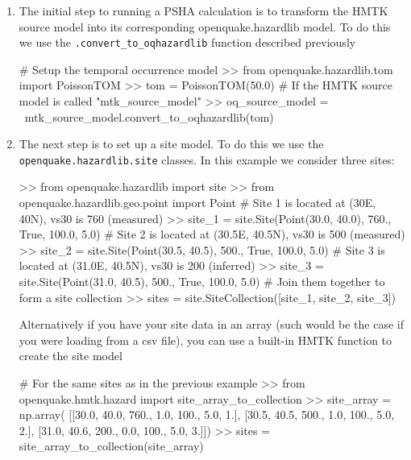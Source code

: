 \begin{enumerate}

\item The initial step to running a PSHA calculation is to transform the HMTK source model into its corresponding openquake.hazardlib model. To do this we use the \verb=.convert_to_oqhazardlib= function described previously

\begin{python}[frame=single]
# Setup the temporal occurrence model
>> from openquake.hazardlib.tom import PoissonTOM
>> tom = PoissonTOM(50.0)
# If the HMTK source model is called "mtk_source_model"
>> oq_source_model = \
    mtk_source_model.convert_to_oqhazardlib(tom)
\end{python}

\item The next step is to set up a site model. To do this we use the \\ \verb=openquake.hazardlib.site= classes. In this example we consider three sites:

\begin{python}[frame=single]
>> from openquake.hazardlib import site
>> from openquake.hazardlib.geo.point import Point
# Site 1 is located at (30E, 40N), vs30 is 760 (measured)
>> site_1 = site.Site(Point(30.0, 40.0), 
                      760.,
                      True,
                      100.0,
                      5.0)
# Site 2 is located at (30.5E, 40.5N), vs30 is 500 (measured)
>> site_2 = site.Site(Point(30.5, 40.5),
                      500.,
                      True,
                      100.0,
                      5.0)
# Site 3 is located at (31.0E, 40.5N), vs30 is 200 (inferred)
>> site_3 = site.Site(Point(31.0, 40.5),
                      500.,
                      True,
                      100.0,
                      5.0)
# Join them together to form a site collection
>> sites = site.SiteCollection([site_1, site_2, site_3])
\end{python}

Alternatively if you have your site data in an array (such would be the case if you were loading from a csv file), you can use a built-in HMTK function to create the site model

\begin{python}[frame=single]
# For the same sites as in the previous example
>> from openquake.hmtk.hazard import site_array_to_collection
>> site_array = np.array(
    [[30.0, 40.0, 760., 1.0, 100., 5.0, 1.],
     [30.5, 40.5, 500., 1.0, 100., 5.0, 2.],
     [31.0, 40.6, 200., 0.0, 100., 5.0, 3.]])
>> sites = site_array_to_collection(site_array)
\end{python}


\end{enumerate}
